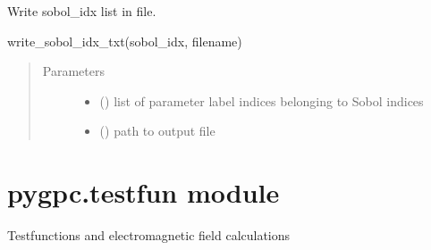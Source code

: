 \documentclass[letterpaper,10pt,english,openany,oneside]{sphinxmanual}
\begin{document}
\begin{fulllineitems}
\label{\detokenize{pygpc:pygpc.rw.write_sobol_idx_txt}}
Write sobol\_idx list in file.

write\_sobol\_idx\_txt(sobol\_idx, filename)
\begin{quote}\begin{description}
\item[{Parameters}] \leavevmode\begin{itemize}
\item {} 
 (\sphinxstyleliteralemphasis{\sphinxupquote{{[}}}\sphinxstyleliteralemphasis{\sphinxupquote{{]} }}) \textendash{} list of parameter label indices belonging to Sobol indices

\item {} 
 () \textendash{} path to output file

\end{itemize}

\end{description}\end{quote}

\end{fulllineitems}



\section{pygpc.testfun module}
\label{\detokenize{pygpc:module-pygpc.testfun}}\label{\detokenize{pygpc:pygpc-testfun-module}}
Testfunctions and electromagnetic field calculations
\end{document}
